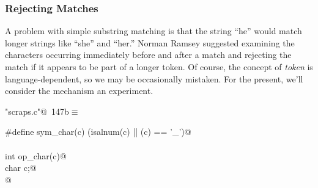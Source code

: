 \documentclass[a4paper]{report}
\begin{document}
\subsubsection{Rejecting Matches}

A problem with simple substring matching is that the string ``he''
would match longer strings like ``she'' and ``her.'' Norman Ramsey
suggested examining the characters occurring immediately before and
after a match and rejecting the match if it appears to be part of a
longer token. Of course, the concept of {\sl token\/} is
language-dependent, so we may be occasionally mistaken.
For the present, we'll consider the mechanism an experiment.

\begin{flushleft} \small
\begin{minipage}{\linewidth}\label{scrap322}\raggedright\small
{} \verb@"scraps.c"@\nobreak\ {\footnotesize {147b}}$\equiv$
\vspace{-1ex}
\begin{list}{}{} \item
\mbox{}\verb@#define sym_char(c) (isalnum(c) || (c) == '_')@\\
\mbox{}\verb@@\\
\mbox{}\verb@static int op_char(c)@\\
\mbox{}\verb@     char c;@\\
\mbox{}@\\
\mbox{}\verb@@{\NWsep}
\end{list}
\vspace{-1.5ex}
\footnotesize
\begin{list}{}{\setlength{\itemsep}{-\parsep}\setlength{\itemindent}{-\leftmargin}}

\end{list}
\end{minipage}
\end{flushleft}
\end{document}

